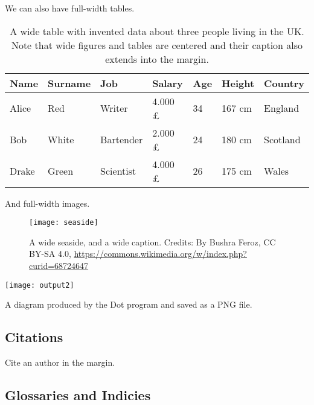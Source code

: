 We can also have full-width tables.

\begin{table*}[h!]
    \caption{A wide table with invented data about three people living in the UK. Note that wide figures and tables are centered and their caption also extends into the margin.}
    \begin{tabular}{p{2.0cm} p{2.0cm} p{2.0cm} p{2.0cm} p{2.0cm} p{2.0cm} p{1.5cm}}
        \toprule
        Name    & Surname   & Job       & Salary           & Age   & Height    & Country \\
        \midrule
        Alice   & Red       & Writer    & 4.000 \pounds    & 34    & 167 cm     & England \\
        Bob     & White     & Bartender & 2.000 \pounds    & 24    & 180 cm     & Scotland \\
        Drake   & Green     & Scientist & 4.000 \pounds    & 26    & 175 cm     & Wales \\
        \bottomrule
    \end{tabular}
\end{table*}

And full-width images.

\blindtext

\begin{figure*}[h!]
	\texttt{[image: seaside]}
	\caption[A wide seaside]{A wide seaside, and a wide caption.
		Credits: By Bushra Feroz, CC BY-SA 4.0, \url{https://commons.wikimedia.org/w/index.php?curid=68724647}}
\end{figure*}

\begin{marginfigure}
	\texttt{[image: output2]}
	\caption[A Dot diagram]{A diagram produced by the Dot program and saved as a PNG file.}
\end{marginfigure}


%
\subsection{Citations}
Cite an author in the margin.

\blindtext


%
\subsection{Glossaries and Indicies}

